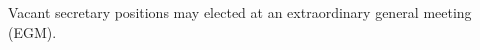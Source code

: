 \begin{clause}
    Vacant secretary positions may elected at an extraordinary general meeting (EGM).
\end{clause}